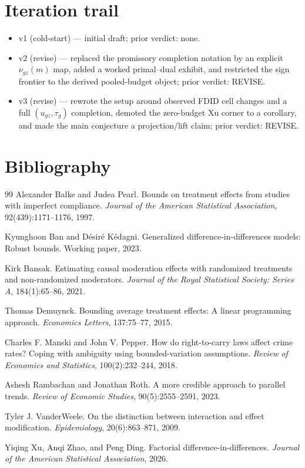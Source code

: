 \documentclass[11pt]{article}
\theoremstyle{definition}
\theoremstyle{plain}
\theoremstyle{remark}
\begin{document}
\section{Iteration trail}
\begin{itemize}[leftmargin=*]
\item v1 (cold-start) --- initial draft; prior verdict: none.
\item v2 (revise) --- replaced the promissory completion notation by an explicit \(\nu_{gz}(m)\) map, added a worked primal--dual exhibit, and restricted the sign frontier to the derived pooled-budget object; prior verdict: REVISE.
\item v3 (revise) --- rewrote the setup around observed FDID cell changes and a full \((u_{gz},\tau_g)\) completion, demoted the zero-budget Xu corner to a corollary, and made the main conjecture a projection/lift claim; prior verdict: REVISE.
\end{itemize}

\section*{Bibliography}
\begin{thebibliography}{99}
Alexander Balke and Judea Pearl.
\newblock Bounds on treatment effects from studies with imperfect compliance.
\newblock \emph{Journal of the American Statistical Association}, 92(439):1171--1176, 1997.

Kyunghoon Ban and D\'esir\'e K\'edagni.
\newblock Generalized difference-in-differences models: Robust bounds.
\newblock Working paper, 2023.

Kirk Bansak.
\newblock Estimating causal moderation effects with randomized treatments and non-randomized moderators.
\newblock \emph{Journal of the Royal Statistical Society: Series A}, 184(1):65--86, 2021.

Thomas Demuynck.
\newblock Bounding average treatment effects: A linear programming approach.
\newblock \emph{Economics Letters}, 137:75--77, 2015.

Charles F. Manski and John V. Pepper.
\newblock How do right-to-carry laws affect crime rates? Coping with ambiguity using bounded-variation assumptions.
\newblock \emph{Review of Economics and Statistics}, 100(2):232--244, 2018.

Ashesh Rambachan and Jonathan Roth.
\newblock A more credible approach to parallel trends.
\newblock \emph{Review of Economic Studies}, 90(5):2555--2591, 2023.

Tyler J. VanderWeele.
\newblock On the distinction between interaction and effect modification.
\newblock \emph{Epidemiology}, 20(6):863--871, 2009.

Yiqing Xu, Anqi Zhao, and Peng Ding.
\newblock Factorial difference-in-differences.
\newblock \emph{Journal of the American Statistical Association}, 2026.

\end{thebibliography}
\end{document}
